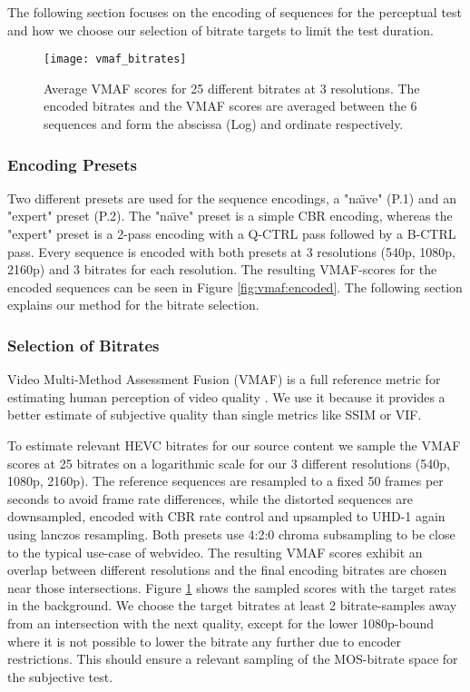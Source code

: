 The following section focuses on the encoding of sequences for the perceptual test and how we choose our selection of bitrate targets to limit the test duration.

\begin{figure}[bht!]
	\centering
	\texttt{[image: vmaf\_bitrates]}
	\caption{Average VMAF scores for 25 different bitrates at 3 resolutions. The encoded bitrates and the VMAF scores are averaged between the 6 sequences and form the abscissa (Log) and ordinate respectively.}
	\label{fig:vmaf:bitrates}
\end{figure}

\subsubsection{Encoding Presets}
Two different presets are used for the sequence encodings, a "na\"{\i}ve" (P.1) and an "expert" preset (P.2). The "na\"{\i}ve" preset is a simple CBR encoding, whereas the "expert" preset is a 2-pass encoding with a Q-CTRL pass followed by a B-CTRL pass.  Every sequence is encoded with both presets at 3 resolutions (540p, 1080p, 2160p) and 3 bitrates for each resolution. The resulting VMAF-scores for the encoded sequences can be seen in Figure \ref{fig:vmaf:encoded}. The following section explains our method for the bitrate selection.

\subsubsection{Selection of Bitrates}
Video Multi-Method Assessment Fusion (VMAF) is a full reference metric for estimating human perception of video quality \cite{lin2013:mmf}. We use it because it provides a better estimate of subjective quality than single metrics like SSIM or VIF.

To estimate relevant HEVC bitrates for our source content we sample the VMAF scores at 25 bitrates on a logarithmic scale for our 3 different resolutions (540p, 1080p, 2160p). The reference sequences are resampled to a fixed 50 frames per seconds to avoid frame rate differences, while the distorted sequences are downsampled, encoded with CBR rate control and upsampled to UHD-1 again using lanczos resampling. Both presets use 4:2:0 chroma subsampling to be close to the typical use-case of webvideo. The resulting VMAF scores exhibit an overlap between different resolutions and the final encoding bitrates are chosen near those intersections. Figure \ref{fig:vmaf:bitrates} shows the sampled scores with the target rates in the background. We choose the target bitrates at least 2 bitrate-samples away from an intersection with the next quality, except for the lower 1080p-bound where it is not possible to lower the bitrate any further due to encoder restrictions. This should ensure a relevant sampling of the MOS-bitrate space for the subjective test.

